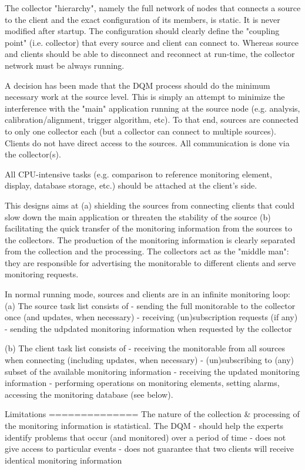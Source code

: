 The collector "hierarchy", namely the full network of nodes that connects a
source to the client and the exact configuration of its members, is
static. It is never modified after startup. The configuration should
clearly define the "coupling point" (i.e. collector) that  every
source and client can connect to. Whereas source and clients should be
able to disconnect and reconnect at run-time, the collector network
must be always running.

A decision has been made that the DQM process should do the minimum
necessary work at the source level. This is simply an attempt to minimize the
interference with the "main" application running at the source
node (e.g. analysis, calibration/alignment, trigger algorithm,
etc). To that end, sources are connected to only one collector each
(but a collector can connect to multiple sources). Clients do not have
direct access to the sources. All communication is done via the
collector(s). 

All CPU-intensive tasks (e.g. comparison to reference monitoring
element, display, database storage, etc.) should be attached at the client's
side. 

This designs aims at (a) shielding the sources from connecting clients
that could slow down the main application or threaten the stability of
the source (b) facilitating the quick transfer of the monitoring
information from the sources to the collectors. The production of the
monitoring information is clearly separated from the collection and
the processing. The collectors act as the "middle man": they are responsible
for advertising the monitorable to different clients and serve
monitoring requests.

In normal running mode, sources and clients are in an infinite
monitoring loop:
(a) The source task list consists of 
- sending the full monitorable to the collector once (and updates,
when necessary) 
- receiving (un)subscription requests (if any)
- sending the udpdated monitoring information when requested by the
collector

(b) The client task list consists of 
- receiving the monitorable from all sources when connecting
(including updates, when necessary)
- (un)subscribing to (any) subset of the available monitoring
information
- receiving the updated monitoring information
- performing operations on monitoring elements, setting alarms,
accessing the monitoring database (see below).

Limitations
==============
The nature of the collection & processing of the monitoring
information is statistical. The DQM 
- should help the experts identify problems that occur (and monitored)
over a period of time
- does not give access to particular events
- does not guarantee that two clients will receive identical
monitoring information

